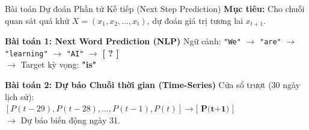 \documentclass[aspectratio=169, 10pt]{beamer}
\begin{document}
\begin{frame}{Bài toán Dự đoán Phần tử Kế tiếp (Next Step Prediction)}
\textbf{Mục tiêu:} Cho chuỗi quan sát quá khứ \(X = (x_1, x_2, \dots, x_t)\), dự đoán giá trị tương lai \(x_{t+1}\).
\vspace{0.4cm}

\begin{block}{\textbf{Bài toán 1: Next Word Prediction (NLP)}}
Ngữ cảnh: \texttt{"We"} \(\rightarrow\) \texttt{"are"} \(\rightarrow\) \texttt{"learning"} \(\rightarrow\) \texttt{"AI"} \(\rightarrow\) \textbf{[ ? ]}\\
\(\rightarrow\) Target kỳ vọng: \textbf{"is"}
\end{block}

\begin{exampleblock}{\textbf{Bài toán 2: Dự báo Chuỗi thời gian (Time-Series)}}
Cửa sổ trượt (30 ngày lịch sử):\\
\([ P(t-29), P(t-28), \dots , P(t-1), P(t) ] \rightarrow \textbf{[ P(t+1) ]}\)\\
\(\rightarrow\) Dự báo biến động ngày 31.
\end{exampleblock}
\end{frame}
\end{document}
